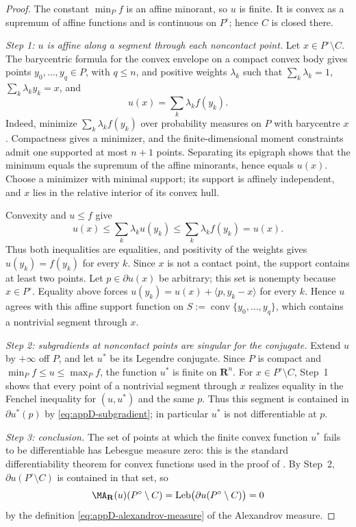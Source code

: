 \begin{proof}
The constant $\min_Pf$ is an affine minorant, so $u$ is finite.  It is
convex as a supremum of affine functions and is continuous on $P^\circ$;
hence $C$ is closed there.

\emph{Step 1: $u$ is affine along a segment through each noncontact
point.}  Let $x\in P^\circ\setminus C$.  The barycentric formula for the
convex envelope on a compact convex body gives points
$y_0,\ldots,y_q\in P$, with $q\leq n$, and positive weights
$\lambda_k$ such that
$\sum_k\lambda_k=1$, $\sum_k\lambda_ky_k=x$, and
\begin{equation}\label{eq:ch23-caratheodory}
                         u(x)=\sum_k\lambda_kf(y_k).
\end{equation}
Indeed, minimize $\sum_k\lambda_kf(y_k)$ over probability measures on
$P$ with barycentre $x$.  Compactness gives a minimizer, and the
finite-dimensional moment constraints admit one supported at most
$n+1$ points.  Separating its epigraph shows that the minimum equals the
supremum of the affine minorants, hence equals $u(x)$.  Choose a minimizer
with minimal support; its support is affinely independent, and $x$ lies in
the relative interior of its convex hull.

Convexity and $u\leq f$ give
\[
 u(x)\leq\sum_k\lambda_ku(y_k)
       \leq\sum_k\lambda_kf(y_k)=u(x).
\]
Thus both inequalities are equalities, and positivity of the weights gives
$u(y_k)=f(y_k)$ for every $k$.  Since $x$ is not a contact point, the
support contains at least two points.  Let $p\in\partial u(x)$ be
arbitrary; this set is nonempty because $x\in P^\circ$.  Equality above forces
$u(y_k)=u(x)+\langle p,y_k-x\rangle$ for every $k$.  Hence $u$ agrees
with this affine support function on
$S:=\operatorname{conv}\{y_0,\ldots,y_q\}$, which contains a nontrivial
segment through $x$.

\emph{Step 2: subgradients at noncontact points are singular for the
conjugate.}  Extend $u$ by $+\infty$ off $P$, and let $u^*$ be its
Legendre conjugate.  Since $P$ is compact and
$\min_Pf\leq u\leq\max_Pf$, the function $u^*$ is finite on
$\mathbf R^n$.  For $x\in P^\circ\setminus C$, Step~1 shows that every
point of a nontrivial segment through $x$ realizes equality in the
Fenchel inequality for $(u,u^*)$ and the same $p$.  Thus this segment is
contained in $\partial u^*(p)$ by
\eqref{eq:appD-subgradient}; in particular $u^*$ is not differentiable at
$p$.

\emph{Step 3: conclusion.}  The set of points at which the finite convex
function $u^*$ fails to be differentiable has Lebesgue measure zero: this
is the standard differentiability theorem for convex functions used in the
proof of .  By Step~2,
$\partial u(P^\circ\setminus C)$ is contained in that set, so
\[
 \MA_{\mathbf R}(u)(P^\circ\setminus C)
 =\operatorname{Leb}\bigl(\partial u(P^\circ\setminus C)\bigr)=0
\]
by the definition \eqref{eq:appD-alexandrov-measure} of the Alexandrov
measure.
\end{proof}

